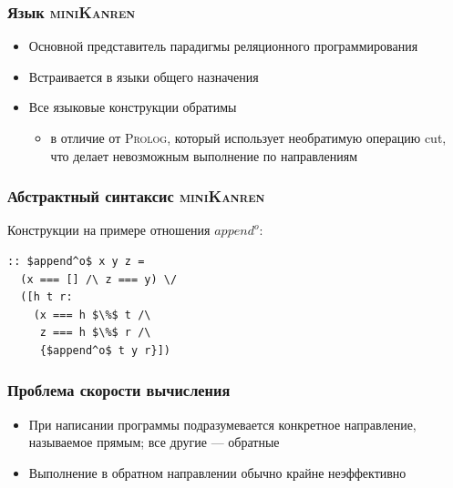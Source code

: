 \documentclass{beamer}
\newcommand{\miniKanren}{\textsc{miniKanren}}
\newcommand{\prolog}{\textsc{Prolog}}
\begin{document}
\begin{frame}\frametitle{Язык \miniKanren{}}
\begin{itemize}
    \item Основной представитель парадигмы реляционного программирования
    \item Встраивается в языки общего назначения
    \item Все языковые конструкции обратимы
        \begin{itemize}
            \item в отличие от \prolog{}, который использует необратимую операцию cut, что делает невозможным выполнение по направлениям
        \end{itemize}
\end{itemize}
\end{frame}

\begin{frame}[fragile]\frametitle{Абстрактный синтаксис \miniKanren{}}
Конструкции на примере отношения $append^o$:
\begin{center}
\begin{lstlisting}
:: $append^o$ x y z =
  (x === [] /\ z === y) \/
  ([h t r:
    (x === h $\%$ t /\
     z === h $\%$ r /\
     {$append^o$ t y r}])
\end{lstlisting}
\end{center}
\end{frame}

\begin{frame}\frametitle{Проблема скорости вычисления}
\begin{itemize}
    \item При написании программы подразумевается конкретное направление, называемое прямым; все другие --- обратные
    \item Выполнение в обратном направлении обычно крайне неэффективно
\end{itemize}
\end{frame}
\end{document}

